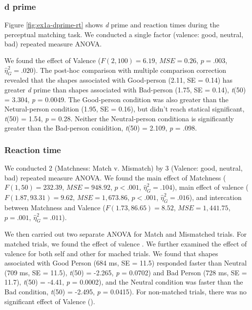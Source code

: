 \documentclass[man]{apa6}
\begin{document}
\hypertarget{d-prime}{%
\subsubsection{d prime}\label{d-prime}}

Figure \ref{fig:ex1a-dprime-rt} shows \emph{d} prime and reaction times during the perceptual matching task. We conducted a single factor (valence: good, neutral, bad) repeated measure ANOVA.

We found the effect of Valence (\(F(2, 100) = 6.19\), \(\mathit{MSE} = 0.26\), \(p = .003\), \(\hat{\eta}^2_G = .020\)). The post-hoc comparison with multiple comparison correction revealed that the shapes associated with Good-person (2.11, SE = 0.14) has greater \emph{d} prime than shapes associated with Bad-person (1.75, SE = 0.14), \emph{t}(50) = 3.304, \emph{p} = 0.0049. The Good-person condition was also greater than the Netural-person condition (1.95, SE = 0.16), but didn't reach statical significant, \emph{t}(50) = 1.54, \emph{p} = 0.28. Neither the Neutral-person conditiona is significantly greater than the Bad-person conidition, \emph{t}(50) = 2.109, \emph{p} = .098.

\hypertarget{reaction-time}{%
\subsubsection{Reaction time}\label{reaction-time}}

We conducted 2 (Matchness: Match v. Mismatch) by 3 (Valence: good, neutral, bad) repeated measure ANOVA. We found the main effect of Matchness (\(F(1, 50) = 232.39\), \(\mathit{MSE} = 948.92\), \(p < .001\), \(\hat{\eta}^2_G = .104\)), main effect of valence (\(F(1.87, 93.31) = 9.62\), \(\mathit{MSE} = 1,673.86\), \(p < .001\), \(\hat{\eta}^2_G = .016\)), and intercation between Matchness and Valence (\(F(1.73, 86.65) = 8.52\), \(\mathit{MSE} = 1,441.75\), \(p = .001\), \(\hat{\eta}^2_G = .011\)).

We then carried out two separate ANOVA for Match and Mismatched trials. For matched trials, we found the effect of valence . We further examined the effect of valence for both self and other for mached trials. We found that shapes associated with Good Person (684 ms, SE = 11.5) responded faster than Neutral (709 ms, SE = 11.5), \emph{t}(50) = -2.265, \emph{p} = 0.0702) and Bad Person (728 ms, SE = 11.7), \emph{t}(50) = -4.41, \emph{p} = 0.0002), and the Neutral condition was faster than the Bad condition, \emph{t}(50) = -2.495, \emph{p} = 0.0415). For non-matched trials, there was no significant effect of Valence ().
\end{document}
